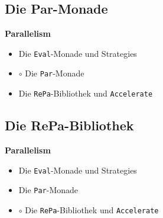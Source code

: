 \documentclass{beamer}
\begin{document}
\subsection{Die Par-Monade}

\begin{frame}[fragile]

\begin{center}
\Large
\textbf{Parallelism}\normalsize\bigskip
\begin{itemize}
\item Die \texttt{Eval}-Monade und Strategies
\item $\circ$ Die \texttt{Par}-Monade
\item Die \texttt{RePa}-Bibliothek und \texttt{Accelerate}
\end{itemize}
\end{center}

\end{frame}


\subsection{Die RePa-Bibliothek}

\begin{frame}[fragile]

\begin{center}
\Large
\textbf{Parallelism}\normalsize\bigskip
\begin{itemize}
\item Die \texttt{Eval}-Monade und Strategies
\item Die \texttt{Par}-Monade
\item $\circ$ Die \texttt{RePa}-Bibliothek und \texttt{Accelerate}
\end{itemize}
\end{center}

\end{frame}

\end{document}
